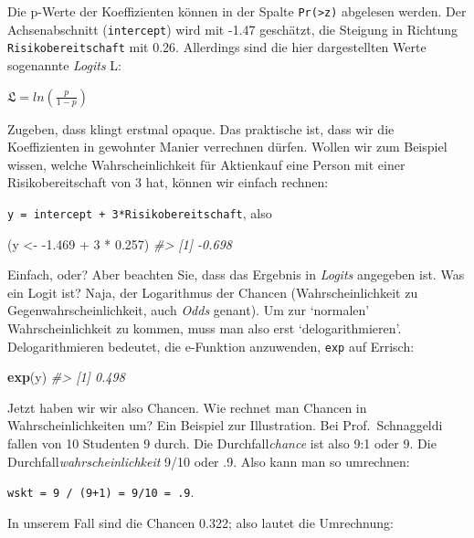 \documentclass[12pt,ngerman,]{book}
\makeatletter
\newenvironment{Shaded}{\begin{snugshade}}{\end{snugshade}}
\newcommand{\KeywordTok}[1]{\textcolor[rgb]{0.13,0.29,0.53}{\textbf{{#1}}}}
\newcommand{\DecValTok}[1]{\textcolor[rgb]{0.00,0.00,0.81}{{#1}}}
\newcommand{\FloatTok}[1]{\textcolor[rgb]{0.00,0.00,0.81}{{#1}}}
\newcommand{\StringTok}[1]{\textcolor[rgb]{0.31,0.60,0.02}{{#1}}}
\newcommand{\CommentTok}[1]{\textcolor[rgb]{0.56,0.35,0.01}{\textit{{#1}}}}
\newcommand{\NormalTok}[1]{{#1}}
\newenvironment{kframe}{%
\medskip{}
\setlength{\fboxsep}{.8em}
 \def\at@end@of@kframe{}%
 \ifinner\ifhmode%
  \def\at@end@of@kframe{\end{minipage}}%
  \begin{minipage}{\columnwidth}%
 \fi\fi%
 \def\FrameCommand##1{\hskip\@totalleftmargin \hskip-\fboxsep
 \colorbox{shadecolor}{##1}\hskip-\fboxsep
     \hskip-\linewidth \hskip-\@totalleftmargin \hskip\columnwidth}%
 \MakeFramed {\advance\hsize-\width
   \@totalleftmargin\z@ \linewidth\hsize
   \@setminipage}}%
 {\par\unskip\endMakeFramed%
 \at@end@of@kframe}
\renewenvironment{Shaded}{\begin{kframe}}{\end{kframe}}
\theoremstyle{definition}
\theoremstyle{definition}
\theoremstyle{remark}
\makeatother
\begin{document}
Die p-Werte der Koeffizienten können in der Spalte
\texttt{Pr(\textgreater{}\textbar{}z\textbar{})} abgelesen werden. Der
Achsenabschnitt (\texttt{intercept}) wird mit -1.47 geschätzt, die
Steigung in Richtung \texttt{Risikobereitschaft} mit 0.26. Allerdings
sind die hier dargestellten Werte sogenannte \emph{Logits}
L:

\(\mathfrak{L} = ln\left( \frac{p}{1-p} \right)\)

Zugeben, dass klingt erstmal opaque. Das praktische ist, dass wir die
Koeffizienten in gewohnter Manier verrechnen dürfen. Wollen wir zum
Beispiel wissen, welche Wahrscheinlichkeit für Aktienkauf eine Person
mit einer Risikobereitschaft von 3 hat, können wir einfach rechnen:

\texttt{y\ =\ intercept\ +\ 3*Risikobereitschaft}, also

\begin{Shaded}
\begin{Highlighting}[]
\NormalTok{(y <-}\StringTok{ }\NormalTok{-}\FloatTok{1.469} \NormalTok{+}\StringTok{ }\DecValTok{3} \NormalTok{*}\StringTok{ }\FloatTok{0.257}\NormalTok{)}
\CommentTok{#> [1] -0.698}
\end{Highlighting}
\end{Shaded}

Einfach, oder? Aber beachten Sie, dass das Ergebnis in \emph{Logits}
angegeben ist. Was ein Logit ist? Naja, der Logarithmus der Chancen
(Wahrscheinlichkeit zu Gegenwahrscheinlichkeit, auch \emph{Odds}
genant). Um zur `normalen' Wahrscheinlichkeit zu kommen, muss man also
erst `delogarithmieren'. Delogarithmieren bedeutet, die e-Funktion
anzuwenden, \texttt{exp} auf Errisch:

\begin{Shaded}
\begin{Highlighting}[]
\KeywordTok{exp}\NormalTok{(y)}
\CommentTok{#> [1] 0.498}
\end{Highlighting}
\end{Shaded}

Jetzt haben wir wir also Chancen. Wie rechnet man Chancen in
Wahrscheinlichkeiten um? Ein Beispiel zur Illustration. Bei
Prof.~Schnaggeldi fallen von 10 Studenten 9 durch. Die
Durchfall\emph{chance} ist also 9:1 oder 9. Die
Durchfall\emph{wahrscheinlichkeit} 9/10 oder .9. Also kann man so
umrechnen:

\texttt{wskt\ =\ 9\ /\ (9+1)\ =\ 9/10\ =\ .9}.

In unserem Fall sind die Chancen 0.322; also lautet die Umrechnung:
\end{document}

